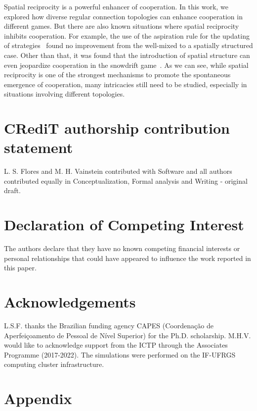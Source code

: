 \documentclass[5p,review]{elsarticle}
\begin{document}
Spatial reciprocity is a powerful enhancer of cooperation. In this work, we explored how diverse regular connection topologies can enhance cooperation in different games. 
%
But there are also known situations where spatial reciprocity inhibits cooperation. For example, the use of the aspiration rule for the updating of strategies~\cite{Du2015} found no improvement from the well-mixed to a spatially structured case. Other than that,  it was found that the introduction of spatial structure can even jeopardize cooperation in the snowdrift game~\cite{Hauert2004}.
%
As we can see, while spatial reciprocity is one of the strongest mechanisms to promote the spontaneous emergence of cooperation, many intricacies still need to be studied, especially in situations involving different topologies.


\section*{CRediT authorship contribution statement}
L. S. Flores and M. H. Vainstein contributed with Software and all authors contributed equally in Conceptualization,
Formal analysis and Writing - original draft.

\section*{Declaration of Competing Interest}
The authors declare that they have no known competing financial interests or personal relationships that could have appeared to influence the work reported in this paper.

\section*{Acknowledgements}
L.S.F. thanks  the Brazilian funding agency CAPES (Coordenação de Aperfeiçoamento de Pessoal de Nível Superior) for the Ph.D. scholarship. 
M.H.V. would like to acknowledge support from the ICTP through the Associates Programme (2017-2022). The simulations were performed on the IF-UFRGS computing cluster infrastructure.

\section*{Appendix} 
\label{app}
\end{document}
